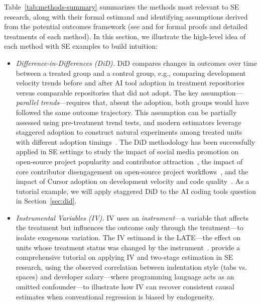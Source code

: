 Table~\ref{tab:methods-summary} summarizes the methods most relevant to SE research, along with their formal estimand and identifying assumptions derived from the potential outcomes framework (see \citet[Chs.~2--6]{angrist2009mostly} and \citet[Chs.~4--9]{cunningham2021causal} for formal proofs and detailed treatments of each method).
In this section, we illustrate the high-level idea of each method with SE examples to build intuition:

\begin{itemize}[leftmargin=15pt]
    \item \emph{Difference-in-Differences (DiD).}
    DiD compares changes in outcomes over time between a treated group and a control group, e.g., comparing development velocity trends before and after AI tool adoption in treatment repositories versus comparable repositories that did not adopt.
    The key assumption---\emph{parallel trends}---requires that, absent the adoption, both groups would have followed the same outcome trajectory.
    This assumption can be partially assessed using pre-treatment trend tests, and modern estimators leverage staggered adoption to construct natural experiments among treated units with different adoption timings~\cite {callaway2021difference, roth2023whats}.
    The DiD methodology has been successfully applied in SE settings to study the impact of social media promotion on open-source project popularity and contributor attraction~\cite{DBLP:conf/icse/FangLHV22}, the impact of core contributor disengagement on open-source project workflows~\cite{DBLP:conf/icse/ChenSSGT26}, and the impact of Cursor adoption on development velocity and code quality~\cite{DBLP:conf/msr/HeMAKV26}.
    As a tutorial example, we will apply staggered DiD to the AI coding tools question in Section~\ref{sec:did}.

    \item \emph{Instrumental Variables (IV).}
    IV uses an \emph{instrument}---a variable that affects the treatment but influences the outcome only through the treatment---to isolate exogenous variation.
    The IV estimand is the LATE---the effect on units whose treatment status was changed by the instrument~\cite{angrist1996identification}.
    \citet{DBLP:journals/tosem/GrafVlachyW24} provide a comprehensive tutorial on applying IV and two-stage estimation in SE research, using the observed correlation between indentation style (tabs vs. spaces) and developer salary---where programming language acts as an omitted confounder---to illustrate how IV can recover consistent causal estimates when conventional regression is biased by endogeneity.


\end{itemize}
